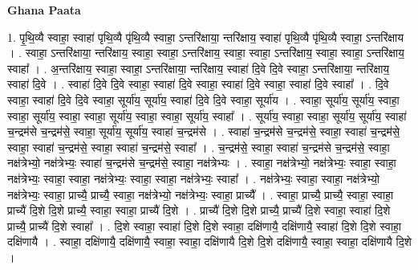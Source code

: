 \documentclass[17pt]{extarticle}
\begin{document}
\textbf{Ghana Paata } \newline

1. पृ॒थि॒व्यै स्वाहा॒ स्वाहा॑ पृथि॒व्यै पृ॑थि॒व्यै स्वाहा॒ ऽन्तरि॑क्षाया॒ न्तरि॑क्षाय॒ स्वाहा॑ पृथि॒व्यै पृ॑थि॒व्यै स्वाहा॒ ऽन्तरि॑क्षाय । . स्वाहा॒ ऽन्तरि॑क्षाया॒ न्तरि॑क्षाय॒ स्वाहा॒ स्वाहा॒ ऽन्तरि॑क्षाय॒ स्वाहा॒ स्वाहा॒ ऽन्तरि॑क्षाय॒ स्वाहा॒ स्वाहा॒ ऽन्तरि॑क्षाय॒ स्वाहा᳚ । . अ॒न्तरि॑क्षाय॒ स्वाहा॒ स्वाहा॒ ऽन्तरि॑क्षाया॒ न्तरि॑क्षाय॒ स्वाहा॑ दि॒वे दि॒वे स्वाहा॒ ऽन्तरि॑क्षाया॒ न्तरि॑क्षाय॒ स्वाहा॑ दि॒वे । . स्वाहा॑ दि॒वे दि॒वे स्वाहा॒ स्वाहा॑ दि॒वे स्वाहा॒ स्वाहा॑ दि॒वे स्वाहा॒ स्वाहा॑ दि॒वे स्वाहा᳚ । . दि॒वे स्वाहा॒ स्वाहा॑ दि॒वे दि॒वे स्वाहा॒ सूर्या॑य॒ सूर्या॑य॒ स्वाहा॑ दि॒वे दि॒वे स्वाहा॒ सूर्या॑य । . स्वाहा॒ सूर्या॑य॒ सूर्या॑य॒ स्वाहा॒ स्वाहा॒ सूर्या॑य॒ स्वाहा॒ स्वाहा॒ सूर्या॑य॒ स्वाहा॒ स्वाहा॒ सूर्या॑य॒ स्वाहा᳚ । . सूर्या॑य॒ स्वाहा॒ स्वाहा॒ सूर्या॑य॒ सूर्या॑य॒ स्वाहा॑ च॒न्द्रम॑से च॒न्द्रम॑से॒ स्वाहा॒ सूर्या॑य॒ सूर्या॑य॒ स्वाहा॑ च॒न्द्रम॑से । . स्वाहा॑ च॒न्द्रम॑से च॒न्द्रम॑से॒ स्वाहा॒ स्वाहा॑ च॒न्द्रम॑से॒ स्वाहा॒ स्वाहा॑ च॒न्द्रम॑से॒ स्वाहा॒ स्वाहा॑ च॒न्द्रम॑से॒ स्वाहा᳚ । . च॒न्द्रम॑से॒ स्वाहा॒ स्वाहा॑ च॒न्द्रम॑से च॒न्द्रम॑से॒ स्वाहा॒ नक्ष॑त्रेभ्यो॒ नक्ष॑त्रेभ्यः॒ स्वाहा॑ च॒न्द्रम॑से च॒न्द्रम॑से॒ स्वाहा॒ नक्ष॑त्रेभ्यः । . स्वाहा॒ नक्ष॑त्रेभ्यो॒ नक्ष॑त्रेभ्यः॒ स्वाहा॒ स्वाहा॒ नक्ष॑त्रेभ्यः॒ स्वाहा॒ स्वाहा॒ नक्ष॑त्रेभ्यः॒ स्वाहा॒ स्वाहा॒ नक्ष॑त्रेभ्यः॒ स्वाहा᳚ । . नक्ष॑त्रेभ्यः॒ स्वाहा॒ स्वाहा॒ नक्ष॑त्रेभ्यो॒ नक्ष॑त्रेभ्यः॒ स्वाहा॒ प्राच्यै॒ प्राच्यै॒ स्वाहा॒ नक्ष॑त्रेभ्यो॒ नक्ष॑त्रेभ्यः॒ स्वाहा॒ प्राच्यै᳚ । . स्वाहा॒ प्राच्यै॒ प्राच्यै॒ स्वाहा॒ स्वाहा॒ प्राच्यै॑ दि॒शे दि॒शे प्राच्यै॒ स्वाहा॒ स्वाहा॒ प्राच्यै॑ दि॒शे । . प्राच्यै॑ दि॒शे दि॒शे प्राच्यै॒ प्राच्यै॑ दि॒शे स्वाहा॒ स्वाहा॑ दि॒शे प्राच्यै॒ प्राच्यै॑ दि॒शे स्वाहा᳚ । . दि॒शे स्वाहा॒ स्वाहा॑ दि॒शे दि॒शे स्वाहा॒ दक्षि॑णायै॒ दक्षि॑णायै॒ स्वाहा॑ दि॒शे दि॒शे स्वाहा॒ दक्षि॑णायै । . स्वाहा॒ दक्षि॑णायै॒ दक्षि॑णायै॒ स्वाहा॒ स्वाहा॒ दक्षि॑णायै दि॒शे दि॒शे दक्षि॑णायै॒ स्वाहा॒ स्वाहा॒ दक्षि॑णायै दि॒शे । \newline
\end{document}
